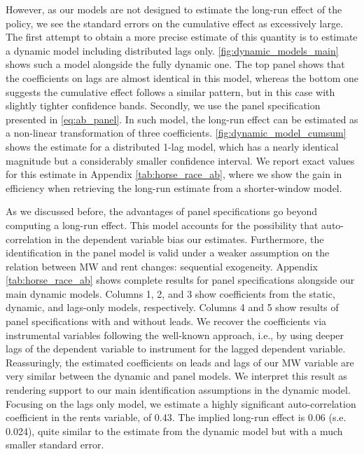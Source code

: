 However, as our models are not designed to estimate the long-run effect of the policy, we see 
the standard errors on the cumulative effect as excessively large. The first attempt to obtain 
a more precise estimate of this quantity is to estimate a dynamic model including distributed 
lags only. \autoref{fig:dynamic_models_main} shows such a model alongside the fully dynamic one. 
The top panel shows that the coefficients on lags are almost identical in this model, whereas 
the bottom one suggests the cumulative effect follows a similar pattern, but in this case with 
slightly tighter confidence bands. Secondly, we use the panel specification presented in 
\autoref{eq:ab_panel}. In such model, the long-run effect can be estimated as a non-linear 
transformation of three coefficients. \autoref{fig:dynamic_model_cumsum} shows the estimate for 
a distributed 1-lag model, 
which has a nearly identical magnitude but a considerably smaller confidence interval. We report 
exact values for this estimate in Appendix \autoref{tab:horse_race_ab}, where we show the gain 
in efficiency when retrieving the long-run estimate from a shorter-window model. 

As we discussed before, the advantages of panel specifications go beyond computing a long-run 
effect. This model accounts for the possibility that auto-correlation in the dependent variable 
bias our estimates. Furthermore, the identification in the panel model is valid under a weaker 
assumption on the relation between MW and rent changes: sequential exogeneity. Appendix 
\autoref{tab:horse_race_ab} shows complete results for panel specifications alongside our main 
dynamic models. Columns 1, 2, and 3 show coefficients from the static, dynamic, and lags-only 
models, respectively. Columns 4 and 5 show results of panel specifications with and without 
leads. We recover the coefficients via instrumental variables following the well-known 
\textcite{ArellanoBond1991} approach, i.e., by using deeper lags of the dependent variable to 
instrument for the lagged dependent variable. Reassuringly, the estimated coefficients on leads 
and lags of our MW variable are very similar between the dynamic and panel models. We interpret 
this result as rendering support to our main identification assumptions in the dynamic model. 
Focusing on the lags only model, we estimate a highly significant auto-correlation coefficient 
in the rents variable, of 0.43. The implied long-run effect is 0.06 (s.e. 0.024), quite similar
to the estimate from the dynamic model but with a much smaller standard error.


